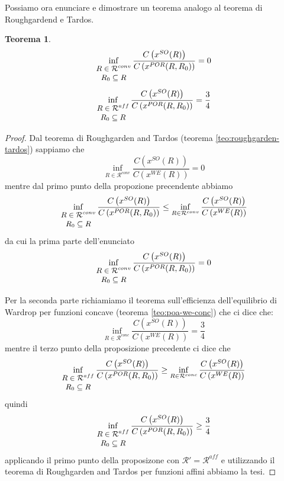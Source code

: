 \documentclass[a4paper]{article}
\newcounter{counter1}
\theoremstyle{plain}
\newtheorem{myteo}[counter1]{Teorema}
\theoremstyle{definition}
\theoremstyle{remark}
\newcommand{\pa}[1]{\left(#1\right)}
\begin{document}
Possiamo ora enunciare e dimostrare un teorema analogo al teorema di
Roughgardend e Tardos.
\begin{myteo}
\label{teo:poa-por}
  \[ \inf _{\small\begin{matrix}R\in \mathcal{R}^{conv}\\R_0\subseteq
        R\end{matrix}}
    \frac{C\pa{x^{SO}(R)}}{C\pa{x^{POR}(R,R_0)}} = 0\]    
  \[ \inf _{\small\begin{matrix}R\in \mathcal{R}^{aff}\\R_0\subseteq
        R\end{matrix}}
    \frac{C\pa{x^{SO}(R)}}{C\pa{x^{POR}(R,R_0)}} = \frac{3}{4} \]    
\end{myteo}
\begin{proof}
  Dal teorema di Roughgarden and Tardos (teorema
  \ref{teo:roughgarden-tardos}) sappiamo che 
  \[ \inf _{R\in \mathcal{R}^{conv}} \frac{C\pa{ x^{SO}(R)}}{C\pa{
        x^{WE}(R)}} = 0 \]
  mentre dal primo punto della propozione precendente abbiamo
  \[ \inf _{\small\begin{matrix}R\in \mathcal{R}^{conv}\\R_0\subseteq
        R\end{matrix}}
    \frac{C\pa{x^{SO}(R)}}{C\pa{x^{POR}(R,R_0)}} \le
    \inf _{R\in \mathcal{R}^{conv}}
    \frac{C\pa{x^{SO}(R)}}{C\pa{x^{WE}(R)}}
  \]
  da cui la prima parte dell'enunciato
  \[ \inf _{\small\begin{matrix}R\in \mathcal{R}^{conv}\\R_0\subseteq
        R\end{matrix}}
    \frac{C\pa{x^{SO}(R)}}{C\pa{x^{POR}(R,R_0)}} = 0\]    
  
  Per la seconda parte richiamiamo il teorema sull'efficienza
  dell'equilibrio di Wardrop per funzioni concave (teorema
  \ref{teo:poa-we-conc}) che ci dice che:
  \[ \inf _{R\in \mathcal{R}^{conc}} \frac{C\pa{ x^{SO}(R)}}{C\pa{
        x^{WE}(R)}} = \frac{3}{4} \]
  mentre il terzo punto della proposizione precedente ci dice che
  \[ \inf _{\small\begin{matrix}R\in \mathcal{R}^{aff}\\R_0\subseteq
        R\end{matrix}}
    \frac{C\pa{x^{SO}(R)}}{C\pa{x^{POR}(R,R_0)}} \ge
    \inf _{R\in \mathcal{R}^{conc}}
    \frac{C\pa{x^{SO}(R)}}{C\pa{x^{WE}(R)}}
  \]
  quindi
  \[ \inf _{\small\begin{matrix}R\in \mathcal{R}^{aff}\\R_0\subseteq
        R\end{matrix}}
    \frac{C\pa{x^{SO}(R)}}{C\pa{x^{POR}(R,R_0)}} \ge \frac{3}{4} \]    
  applicando il primo punto della proposizone con $\mathcal{R}' =
  \mathcal{R}^{aff}$ e utilizzando il teorema di Roughgarden and
  Tardos per funzioni affini abbiamo la tesi.
\end{proof}
\end{document}
